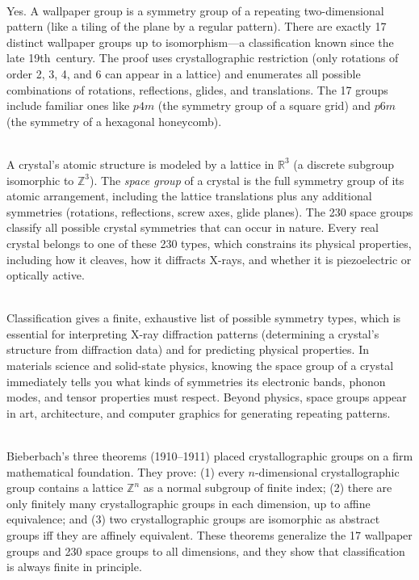 \begin{description}[font=\bfseries, leftmargin=2em, style=nextline]

\item[Q: Are there really exactly 17 wallpaper groups?]\hfill\\
Yes. A wallpaper group is a symmetry group of a repeating two-dimensional pattern (like a tiling of the plane by a regular pattern). There are exactly 17 distinct wallpaper groups up to isomorphism---a classification known since the late 19th~century. The proof uses crystallographic restriction (only rotations of order 2, 3, 4, and 6 can appear in a lattice) and enumerates all possible combinations of rotations, reflections, glides, and translations. The 17 groups include familiar ones like $p4m$ (the symmetry group of a square grid) and $p6m$ (the symmetry of a hexagonal honeycomb).

\item[Q: What do crystallographic groups have to do with real crystals?]\hfill\\
A crystal's atomic structure is modeled by a lattice in $\mathbb{R}^3$ (a discrete subgroup isomorphic to $\mathbb{Z}^3$). The \emph{space group} of a crystal is the full symmetry group of its atomic arrangement, including the lattice translations plus any additional symmetries (rotations, reflections, screw axes, glide planes). The 230 space groups classify all possible crystal symmetries that can occur in nature. Every real crystal belongs to one of these 230 types, which constrains its physical properties, including how it cleaves, how it diffracts X-rays, and whether it is piezoelectric or optically active.

\item[Q: Why is the classification of space groups important?]\hfill\\
Classification gives a finite, exhaustive list of possible symmetry types, which is essential for interpreting X-ray diffraction patterns (determining a crystal's structure from diffraction data) and for predicting physical properties. In materials science and solid-state physics, knowing the space group of a crystal immediately tells you what kinds of symmetries its electronic bands, phonon modes, and tensor properties must respect. Beyond physics, space groups appear in art, architecture, and computer graphics for generating repeating patterns.

\item[Q: What is a Bieberbach theorem?]\hfill\\
Bieberbach's three theorems (1910--1911) placed crystallographic groups on a firm mathematical foundation. They prove: (1) every $n$-dimensional crystallographic group contains a lattice $\mathbb{Z}^n$ as a normal subgroup of finite index; (2) there are only finitely many crystallographic groups in each dimension, up to affine equivalence; and (3) two crystallographic groups are isomorphic as abstract groups iff they are affinely equivalent. These theorems generalize the 17 wallpaper groups and 230 space groups to all dimensions, and they show that classification is always finite in principle.


\end{description}
